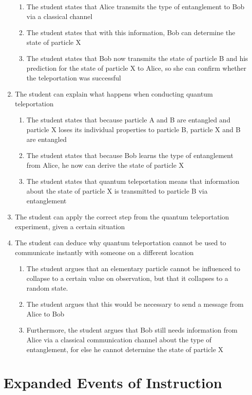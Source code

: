 \documentclass[11pt,twoside]{report} %
\begin{document}
\begin{enumerate}
\begin{enumerate}
\item The student states that Alice transmits the type of entanglement to Bob via a classical channel
\item The student states that with this information, Bob can determine the state of particle X
\item The student states that Bob now transmits the state of particle B and his prediction for the state of particle X to Alice, so she can confirm whether the teleportation was successful
\end{enumerate}
\item The student can explain what happens when conducting quantum teleportation
\begin{enumerate}
\item The student states that because particle A and B are entangled and particle X loses its individual properties to particle B, particle X and B are entangled
\item The student states that because Bob learns the type of entanglement from Alice, he now can derive the state of particle X
\item The student states that quantum teleportation means that information about the state of particle X is transmitted to particle B via entanglement
\end{enumerate}
\item The student can apply the correct step from the quantum teleportation experiment, given a certain situation
\item The student can deduce why quantum teleportation cannot be used to communicate instantly with someone on a different location
\begin{enumerate}
\item The student argues that an elementary particle cannot be influenced to collapse to a certain value on observation, but that it collapses to a random state.
\item The student argues that this would be necessary to send a message from Alice to Bob
\item Furthermore, the student argues that Bob still needs information from Alice via a classical communication channel about the type of entanglement, for else he cannot determine the state of particle X
\end{enumerate}
\end{enumerate}

\chapter{Expanded Events of Instruction}
\end{document}
